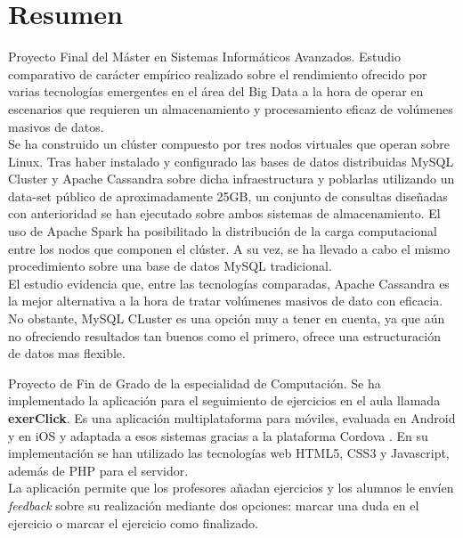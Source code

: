 \section*{Resumen}

Proyecto Final del Máster en Sistemas Informáticos Avanzados. Estudio comparativo de carácter empírico realizado sobre el rendimiento ofrecido por varias tecnologías emergentes en el área del Big Data a la hora de operar en escenarios que requieren un almacenamiento y procesamiento eficaz de volúmenes masivos de datos.\\

Se ha construido un clúster compuesto por tres nodos virtuales que operan sobre Linux. Tras haber instalado y configurado las bases de datos distribuidas MySQL Cluster \cite{mysqlcluster} y Apache Cassandra \cite{apachecassandra} sobre dicha infraestructura y poblarlas utilizando un data-set público de aproximadamente 25GB, un conjunto de consultas diseñadas con anterioridad se han ejecutado sobre ambos sistemas de almacenamiento. El uso de Apache Spark \cite{apachespark} ha posibilitado la distribución de la carga computacional entre los nodos que componen el clúster. A su vez, se ha llevado a cabo el mismo procedimiento sobre una base de datos MySQL tradicional.\\

El estudio evidencia que, entre las tecnologías comparadas, Apache Cassandra es la mejor alternativa a la hora de tratar volúmenes masivos de dato con eficacia. No obstante, MySQL CLuster es una opción muy a tener en cuenta, ya que aún no ofreciendo resultados tan buenos como el primero, ofrece una estructuración de datos mas flexible.









Proyecto de Fin de Grado de la especialidad de Computación. Se ha implementado la aplicación para el seguimiento de ejercicios en el aula llamada \textbf{exerClick}. Es una aplicación multiplataforma para móviles, evaluada en Android y en iOS y adaptada a esos sistemas gracias a la plataforma Cordova \cite{apachecordova}. En su implementación se han utilizado las tecnologías web HTML5, CSS3 y Javascript, además de PHP para el servidor.\\

La aplicación permite que los profesores añadan ejercicios y los alumnos le envíen \textit{feedback} sobre su realización mediante dos opciones: marcar una duda en el ejercicio o marcar el ejercicio como finalizado.\\

